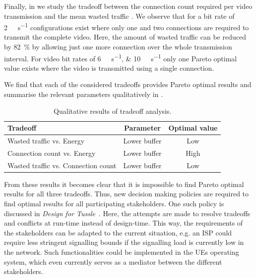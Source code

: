 Finally, in  we study the tradeoff between the connection count \connectioncount required per video transmission and the mean wasted traffic \meanwastedtraffic.
We observe that for a bit rate \bitrate of \SI{2}{\mega\bit\per\second} configurations exist where only one and two connections are required to transmit the complete video.
Here, the amount of wasted traffic can be reduced by \SI{82}{\percent} by allowing just one more connection over the whole transmission interval.
For video bit rates \bitrate of \SIlist{6;10}{\mega\bit\per\second} only one Pareto optimal value exists where the video is transmitted using a single connection.

We find that each of the considered tradeoffs provides Pareto optimal results and summarise the relevant parameters qualitatively in .
\begin{table}
  \centering
  \begin{tabular}{lcc}
    \toprule
  Tradeoff & Parameter & Optimal value\\
    \midrule
    Wasted traffic vs. Energy & Lower buffer & Low\\
    Connection count vs. Energy & Lower buffer & High\\
    Wasted traffic vs. Connection count & Lower buffer & Low\\
    \bottomrule
  \end{tabular}
  \caption{Qualitative results of tradeoff analysis.}
  \label{tab:application:lte_video:numerical_evaluation:trade_offs:summary}
\end{table}

From these results it becomes clear that it is impossible to find Pareto optimal results for all three tradeoffs.
Thus, new decision making policies are required to find optimal results for all participating stakeholders.
One such policy is discussed in \emph{Design for Tussle}~\cite{trilogy2008,Clark2005}.
Here, the attempts are made to resolve tradeoffs and conflicts at run-time instead of design-time.
This way, the requirements of the stakeholders can be adapted to the current situation, e.g. an \gls{ISP} could require less stringent signalling bounds if the signalling load is currently low in the network.
Such functionalities could be implemented in the \glspl{UE} operating system, which even currently serves as a mediator between the different stakeholders.